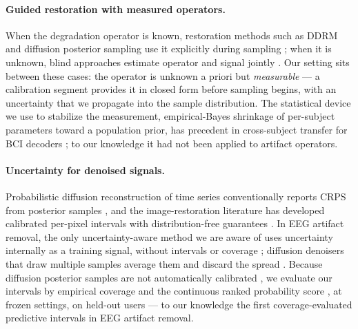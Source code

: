 \paragraph{Guided restoration with measured operators.}
When the degradation operator is known, restoration methods such as DDRM and diffusion posterior sampling use it explicitly during sampling \cite{kawar2022ddrm,chung2023dps}; when it is unknown, blind approaches estimate operator and signal jointly \cite{chung2023blinddps,murata2023gibbsddrm}. Our setting sits between these cases: the operator is unknown a priori but \emph{measurable} --- a calibration segment provides it in closed form before sampling begins, with an uncertainty that we propagate into the sample distribution. The statistical device we use to stabilize the measurement, empirical-Bayes shrinkage of per-subject parameters toward a population prior, has precedent in cross-subject transfer for BCI decoders \cite{jayaram2016transfer}; to our knowledge it had not been applied to artifact operators.

\paragraph{Uncertainty for denoised signals.}
Probabilistic diffusion reconstruction of time series conventionally reports CRPS from posterior samples \cite{tashiro2021csdi,alcaraz2023sssd}, and the image-restoration literature has developed calibrated per-pixel intervals with distribution-free guarantees \cite{angelopoulos2022imageimage}. In EEG artifact removal, the only uncertainty-aware method we are aware of uses uncertainty internally as a training signal, without intervals or coverage \cite{jin2023udnet}; diffusion denoisers that draw multiple samples average them and discard the spread \cite{li2023descod}. Because diffusion posterior samples are not automatically calibrated \cite{crafts2025bipsda}, we evaluate our intervals by empirical coverage and the continuous ranked probability score \cite{gneiting2007strictly}, at frozen settings, on held-out users --- to our knowledge the first coverage-evaluated predictive intervals in EEG artifact removal.
